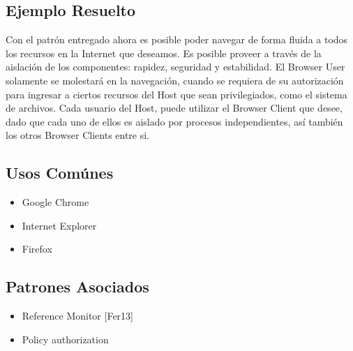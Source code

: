 \subsection{Ejemplo Resuelto}
Con el patrón entregado ahora es posible poder navegar de forma fluida a todos los recursos en la Internet que deseamos. Es posible proveer a través de la aislación de los componentes: rapidez, seguridad y estabilidad. El Browser User solamente se molestará en la navegación, cuando se requiera de su autorización para ingresar a ciertos recursos del Host que sean privilegiados, como el sistema de archivos. Cada usuario del Host, puede utilizar el Browser Client que desee, dado que cada uno de ellos es aislado por procesos independientes, así también los otros Browser Clients entre si.

\subsection{Usos Comúnes}
\begin{itemize}
	\item Google Chrome
	\item Internet Explorer
	\item Firefox
\end{itemize}
\subsection{Patrones Asociados}
\begin{itemize}
	\item Reference Monitor [Fer13]
	\item Policy authorization
\end{itemize}
